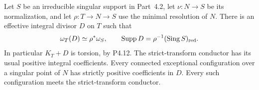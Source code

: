 \begin{proposition}[P4R.6]\hypertarget{tag-02YI}{}\label{night:P4R.6}\label{stmt:P4R.6}

Let $S$ be an irreducible singular support in
Part~4.2, let $\nu:N\to S$ be its normalization,
and let $\rho:T\to N\to S$ use the minimal
resolution of $N$. There is an effective integral
divisor $D$ on $T$ such that
\[
 \omega_T(D)\simeq\rho^*\omega_S,
 \qquad \operatorname{Supp}D
       =\rho^{-1}(\operatorname{Sing}S)_{\rm red}.
\]
In particular $K_T+D$ is torsion, by P4.12.
The strict-transform conductor has its usual
positive integral coefficients. Every connected
exceptional configuration over a singular point
of $N$ has strictly positive coefficients in $D$.
Every such configuration meets the strict-transform
conductor.
\end{proposition}
